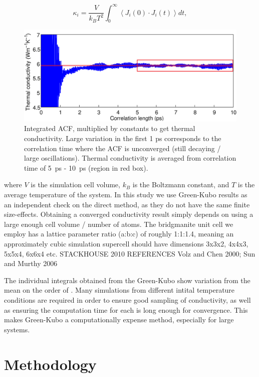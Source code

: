 \documentclass[%
preprint,                                  %
nofootinbib,
 amsmath,amssymb,
 aps,
]{revtex4-1}
\begin{document}
\begin{equation}
\kappa_i = \frac{V}{k_{B}T^2} \int_{0}^{\infty} \left \langle J_i(0) \cdot  J_i(t) \right \rangle dt ,
\label{gk-int}
\end{equation}
\begin{figure}[h]
  \includegraphics[width=\linewidth]{images/gk_int.png}
  \caption{Integrated ACF, multiplied by constants to get thermal conductivity. Large variation in the first 1 ps corresponds to the correlation time where the ACF is unconverged (still decaying / large oscillations). Thermal conductivity is averaged from correlation time of 5~ps - 10~ps (region in red box).}
  \label{fig:gk_int}
\end{figure}
where $V$ is the simulation cell volume, $k_B$ is the Boltzmann constant, and $T$ is the average temperature of the system. In this study we use Green-Kubo results as an independent check on the direct method, as they do not have the same finite size-effects. Obtaining a converged conductivity result simply depends on using a large enough cell volume / number of atoms. The bridgmanite unit cell we employ has a lattice parameter ratio (a:b:c) of roughly 1:1:1.4, meaning an approximately cubic simulation supercell should have dimensions 3x3x2, 4x4x3, 5x5x4, 6x6x4 etc. STACKHOUSE 2010 REFERENCES Volz and Chen 2000; Sun and Murthy 2006

The individual integrals obtained from the Green-Kubo show variation from the mean on the order of \wmk. Many simulations from different intital temperature conditions are required in order to ensure good sampling of conductivity, as well as ensuring the computation time for each is long enough for convergence. This makes Green-Kubo a computationally expense method, especially for large systems.







\section{\label{sec:methodology}Methodology}
\end{document}
